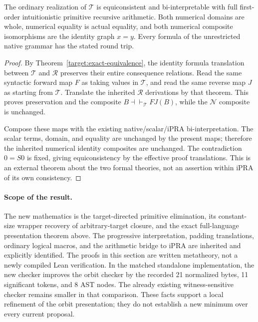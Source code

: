 \begin{theorem}
\label{target:biinterpretation}
The ordinary realization of $\mathcal T$ is equiconsistent and
bi-interpretable with full first-order intuitionistic primitive recursive
arithmetic.  Both numerical domains are whole, numerical equality is actual
equality, and both numerical composite isomorphisms are the identity graph
$x=y$.  Every formula of the unrestricted native grammar has the stated
round trip.
\end{theorem}
\begin{proof}
By Theorem~\ref{target:exact-equivalence}, the identity formula translation
between $\mathcal T$ and $\mathcal R$ preserves their entire consequence
relations.  Read the same syntactic forward map $F$ as taking values in
$\mathcal T$, and read the same reverse map $J$ as starting from
$\mathcal T$.  Translate the inherited $\mathcal R$ derivations by that
theorem.  This proves preservation and the composite
$B\dashv\vdash_{\mathcal T}FJ(B)$, while the $\mathcal N$ composite is
unchanged.

Compose these maps with the existing native/scalar/iPRA bi-interpretation.\cite{bridge}
The scalar terms, domain, and equality are unchanged by the present maps;
therefore the inherited numerical identity composites are unchanged.
The contradiction $0=S0$ is fixed, giving equiconsistency by the effective
proof translations.  This is an external theorem about the two formal
theories, not an assertion within iPRA of its own consistency.
\end{proof}

\paragraph{Scope of the result.}
The new mathematics is the target-directed primitive elimination,
its constant-size wrapper recovery of arbitrary-target closure, and the
exact full-language presentation theorem above.  The progressive
interpretation, padding translations, ordinary logical macros, and the
arithmetic bridge to iPRA are inherited and explicitly identified.
The proofs in this section are written metatheory, not a newly compiled
Lean verification.  In the matched standalone implementation, the new
checker improves the orbit checker by the recorded 21 normalized bytes,
11 significant tokens, and 8 AST nodes.  The already existing
witness-sensitive checker remains smaller in that comparison.  These facts
support a local refinement of the orbit presentation; they do not establish
a new minimum over every current proposal.
